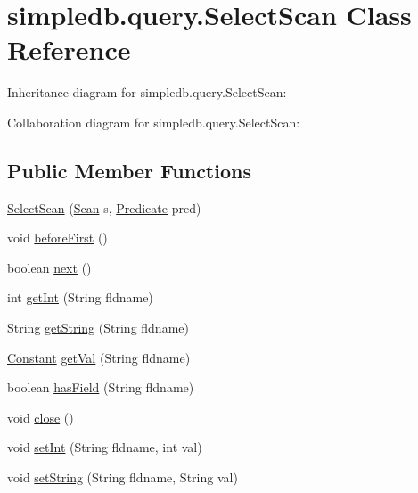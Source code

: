 \hypertarget{classsimpledb_1_1query_1_1SelectScan}{}\section{simpledb.\+query.\+Select\+Scan Class Reference}
\label{classsimpledb_1_1query_1_1SelectScan}


Inheritance diagram for simpledb.\+query.\+Select\+Scan\+:


Collaboration diagram for simpledb.\+query.\+Select\+Scan\+:
\subsection*{Public Member Functions}
\begin{DoxyCompactItemize}
\item 
\hyperlink{classsimpledb_1_1query_1_1SelectScan_a3a8549a84679207bd80b583b7bb4c3f4}{Select\+Scan} (\hyperlink{interfacesimpledb_1_1query_1_1Scan}{Scan} s, \hyperlink{classsimpledb_1_1query_1_1Predicate}{Predicate} pred)
\item 
void \hyperlink{classsimpledb_1_1query_1_1SelectScan_a5ba571c7504c39532b8a211f804e1726}{before\+First} ()
\item 
boolean \hyperlink{classsimpledb_1_1query_1_1SelectScan_aefb8c0f74e03179755553ce178f7504d}{next} ()
\item 
int \hyperlink{classsimpledb_1_1query_1_1SelectScan_af1af0f56c8c9afcc128cc2be6f4f4670}{get\+Int} (String fldname)
\item 
String \hyperlink{classsimpledb_1_1query_1_1SelectScan_a82a4ef8dd0ba1287cfb3bd9f25d01bd2}{get\+String} (String fldname)
\item 
\hyperlink{classsimpledb_1_1query_1_1Constant}{Constant} \hyperlink{classsimpledb_1_1query_1_1SelectScan_a5e5fcf6179ecbbb316e6fde68a04dc7f}{get\+Val} (String fldname)
\item 
boolean \hyperlink{classsimpledb_1_1query_1_1SelectScan_ab96fcae15d9b956cddd234ae1cbe84e7}{has\+Field} (String fldname)
\item 
void \hyperlink{classsimpledb_1_1query_1_1SelectScan_a5baa8036fe4b4ab88760ce5cad67e7ec}{close} ()
\item 
void \hyperlink{classsimpledb_1_1query_1_1SelectScan_a1c800a9b658cc70338670412913ac614}{set\+Int} (String fldname, int val)
\item 
void \hyperlink{classsimpledb_1_1query_1_1SelectScan_a89d69e60a20cab136352370e7e27d1db}{set\+String} (String fldname, String val)

\end{DoxyCompactItemize}
